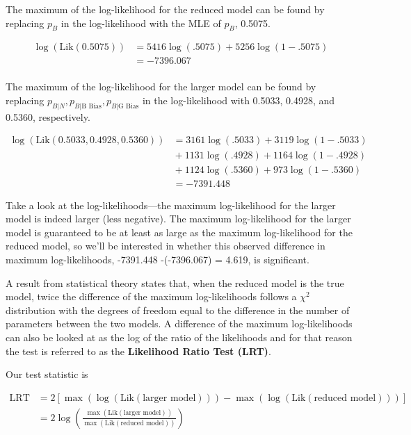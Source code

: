 \documentclass[
]{krantz}
\newcommand{\Lik}{\mathrm{Lik}}
\newcommand{\neutral}{p_{B|N}}
\newcommand{\gbias}{p_{B|\textrm{G Bias}}}
\newcommand{\bbias}{p_{B|\textrm{B Bias}}}
\begin{document}
The maximum of the log-likelihood for the reduced model can be found by replacing \(p_{B}\) in the log-likelihood with the MLE of \(p_{B}\), 0.5075.

\begin{align*}
\log(\Lik(0.5075))& = 5416\log(.5075) + 5256\log(1-.5075)\\
&= -7396.067\\
\end{align*}

The maximum of the log-likelihood for the larger model can be found by replacing \(\neutral, \bbias, \gbias\) in the log-likelihood with 0.5033, 0.4928, and 0.5360, respectively.

\begin{align*}
 \log(\Lik(0.5033, 0.4928, 0.5360)) &=  3161\log(.5033)+3119\log(1-.5033)\\
 & {}+ 1131\log(.4928)+1164\log(1-.4928)\\
 & {}+ 1124\log(.5360)+973\log(1-.5360)\\
 &= -7391.448
\end{align*}

Take a look at the log-likelihoods---the maximum log-likelihood for the larger model is indeed larger (less negative). The maximum log-likelihood for the larger model is guaranteed to be at least as large as the maximum log-likelihood for the reduced model, so we'll be interested in whether this observed difference in maximum log-likelihoods, -7391.448 -(-7396.067) = 4.619, is significant.

A result from statistical theory states that, when the reduced model is the true model, twice the difference of the maximum log-likelihoods follows a \(\chi^2\) distribution with the degrees of freedom equal to the difference in the number of parameters between the two models. A difference of the maximum log-likelihoods can also be looked at as the log of the ratio of the likelihoods and for that reason the test is referred to as the \textbf{Likelihood Ratio Test (LRT)}.

Our test statistic is

\begin{align}    
 \textrm{LRT} &= 2[\max(\log(\Lik(\textrm{larger model}))) - \max(\log(\Lik(\textrm{reduced model})))] \\
     &= 2\log\left(\frac{\max(\Lik(\textrm{larger  model}))}{\max(\Lik(\textrm{reduced model}))} \right)
\end{align}
\end{document}
